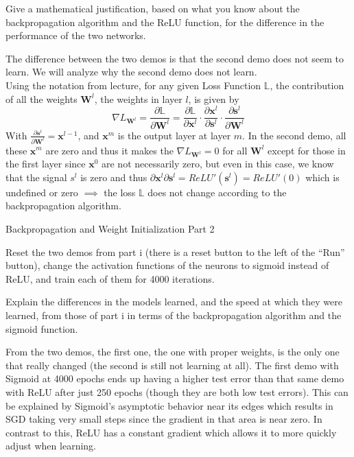 Give a mathematical justification, based on what you know about the backpropagation algorithm and the ReLU function, for the difference in the performance of the two networks.

\begin{subsolution}
  The difference between the two demos is that the second demo does not seem to learn. We will analyze why the second demo does not learn. \\
  Using the notation from lecture, for any given Loss Function $\mathbb{L}$, the contribution of all the weights $\mathbf{W}^{l}$, the weights in layer $l$, is given by $$\nabla{L}_{\mathbf{W}^{l}} = \frac{\partial \mathbb{L}}{\partial \mathbf{W}^{l}} = \frac{\partial \mathbb{L}}{\partial \mathbf{x}^{l}} \cdot \frac{\partial \mathbf{x}^{l}}{\partial \mathbf{s}^{l}} \cdot \frac{\partial \mathbf{s}^{l}}{\partial \mathbf{W}^{l}}$$
  With $\frac{\partial \mathbf{s}^{l}}{\partial \mathbf{W}^{l}} = \mathbf{x}^{l-1}$, and $\mathbf{x}^{m}$ is the output layer at layer $m$. In the second demo, all these $\mathbf{x}^{m}$ are zero and thus it makes the $\nabla{L}_{\mathbf{W}^{l}} = 0$ for all $\mathbf{W}^{l}$ except for those in the first layer since $\mathbf{x}^0$ are not necessarily zero, but even in this case, we know that the signal $s^l$ is zero and thus ${\partial \mathbf{x}^{l}}{\partial \mathbf{s}^{l}} = ReLU'(\mathbf{s}^{l}) = ReLU'(0)$ which is undefined or zero $\implies$ the loss $\mathbb{L}$ does not change according to the backpropagation algorithm. 

\end{subsolution}

\begin{problem}[5]
  Backpropagation and Weight Initialization Part 2
\end{problem}
Reset the two demos from part i (there is a reset button to the left of the ``Run'' button), change the activation functions of the neurons to sigmoid instead of ReLU, and train each of them for 4000 iterations.

Explain the differences in the models learned, and the speed at which they were learned, from those of part i in terms of the backpropagation algorithm and the sigmoid function.



\begin{subsolution}
  From the two demos, the first one, the one with proper weights, is the only one that really changed (the second is still not learning at all). The first demo with Sigmoid at 4000 epochs ends up having a higher test error than that same demo with ReLU after just 250 epochs (though they are both low test errors). This can be explained by Sigmoid's asymptotic behavior near its edges which results in SGD taking very small steps since the gradient in that area is near zero. In contrast to this, ReLU has a constant gradient which allows it to more quickly adjust when learning. 
\end{subsolution}



